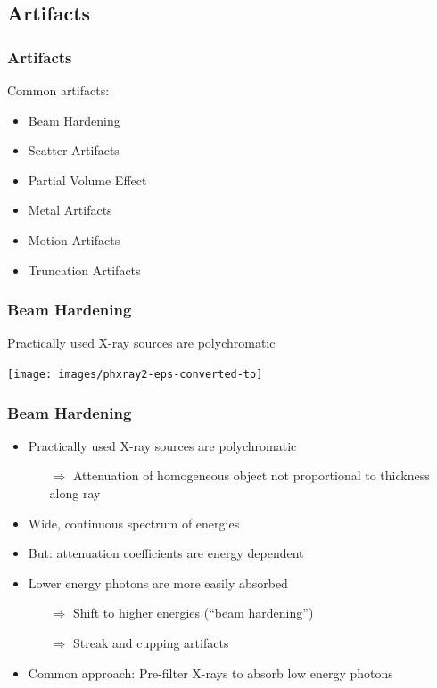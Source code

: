 \subsection{Artifacts}

\begin{frame}
	\frametitle{Artifacts}

	Common artifacts:

	\begin{itemize}
		\setlength\itemsep{0.3cm}
		\item Beam Hardening
		\item Scatter Artifacts
		\item Partial Volume Effect
		\item Metal Artifacts
		\item Motion Artifacts
		\item Truncation Artifacts
	\end{itemize}

\end{frame}

\begin{frame}
	\frametitle{Beam Hardening}
	Practically used X-ray sources are polychromatic
 	\begin{center}\texttt{[image: images/phxray2-eps-converted-to]}\end{center}
\end{frame}

\begin{frame}
	\frametitle{Beam Hardening}

	\begin{itemize}
		\setlength\itemsep{0.3cm}
		\item Practically used X-ray sources are polychromatic
		      \begin{itemize}
			      \item[$\Rightarrow$] Attenuation of homogeneous object not proportional to thickness along ray
		      \end{itemize}
		\item Wide, continuous spectrum of energies
		\item But: attenuation coefficients are energy dependent
		\item Lower energy photons are more easily absorbed
		      \begin{itemize}
			      \item[$\Rightarrow$] Shift to higher energies (``beam hardening'')
			      \item[$\Rightarrow$] Streak and cupping artifacts
		      \end{itemize}
		\item Common approach: Pre-filter X-rays to absorb low energy photons
	\end{itemize}

\end{frame}

